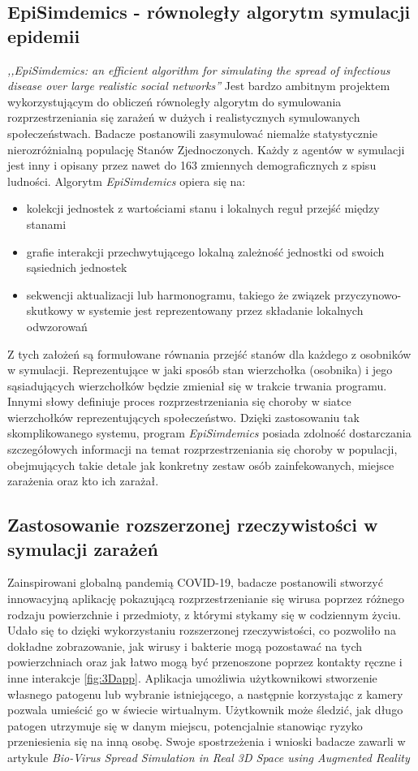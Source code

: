 \subsection{\textbf{EpiSimdemics - równoległy algorytm symulacji epidemii}}
\textit{,,EpiSimdemics: an efficient algorithm for simulating the spread of infectious disease over large realistic social networks''} \cite{bib:konferencja} Jest bardzo ambitnym projektem wykorzystującym do obliczeń równoległy algorytm do symulowania rozprzestrzeniania się zarażeń w dużych i realistycznych symulowanych społeczeństwach. Badacze postanowili zasymulować niemalże statystycznie nierozróżnialną populację Stanów Zjednoczonych. Każdy z agentów w symulacji jest inny i opisany przez nawet do 163 zmiennych demograficznych z spisu ludności. Algorytm \textit{EpiSimdemics} opiera się na:
\begin{itemize}
	\item kolekcji jednostek z wartościami stanu i lokalnych reguł przejść między stanami
	\item grafie interakcji przechwytującego lokalną zależność jednostki od swoich sąsiednich jednostek
	\item sekwencji aktualizacji lub harmonogramu, takiego że związek przyczynowo-skutkowy w systemie jest 	reprezentowany przez składanie lokalnych odwzorowań
\end{itemize}
Z tych założeń są formułowane równania przejść stanów dla każdego z osobników w symulacji. Reprezentujące w jaki sposób stan wierzchołka (osobnika) i jego sąsiadujących wierzchołków będzie zmieniał się w trakcie trwania programu. Innymi słowy definiuje proces rozprzestrzeniania się choroby w siatce wierzchołków reprezentujących społeczeństwo.
	Dzięki zastosowaniu tak skomplikowanego systemu, program \textit{EpiSimdemics} posiada zdolność dostarczania szczegółowych informacji na temat rozprzestrzeniania się choroby w populacji, obejmujących takie detale jak konkretny zestaw osób zainfekowanych, miejsce zarażenia oraz kto ich zarażał.
\subsection{\textbf{Zastosowanie rozszerzonej rzeczywistości w symulacji zarażeń}}

Zainspirowani globalną pandemią COVID-19, badacze postanowili stworzyć innowacyjną aplikację pokazującą rozprzestrzenianie się wirusa poprzez różnego rodzaju powierzchnie i przedmioty, z którymi stykamy się w codziennym życiu. Udało się to dzięki wykorzystaniu rozszerzonej rzeczywistości, co pozwoliło na dokładne zobrazowanie, jak wirusy i bakterie mogą pozostawać na tych powierzchniach oraz jak łatwo mogą być przenoszone poprzez kontakty ręczne i inne interakcje \ref{fig:3Dapp}. Aplikacja umożliwia użytkownikowi stworzenie własnego patogenu lub wybranie istniejącego, a następnie korzystając z kamery pozwala umieścić go w świecie wirtualnym. Użytkownik może śledzić, jak długo patogen utrzymuje się w danym miejscu, potencjalnie stanowiąc ryzyko przeniesienia się na inną osobę. Swoje spostrzeżenia i wnioski badacze zawarli w artykule \textit{Bio-Virus Spread Simulation in Real 3D Space using Augmented Reality} \cite{bib:artykul2}

